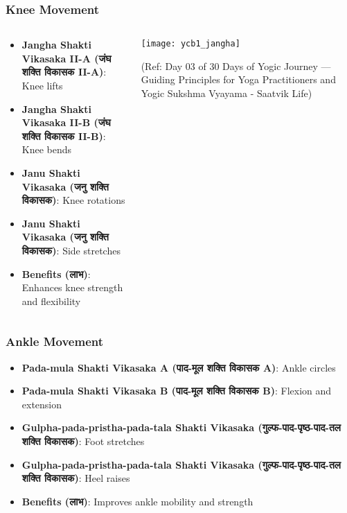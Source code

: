 \begin{frame}[fragile]\frametitle{Knee Movement}
\begin{columns}
    \begin{column}[T]{0.5\linewidth}
      \begin{itemize}
		\item \textbf{Jangha Shakti Vikasaka II-A (जंघ शक्ति विकासक II-A)}: Knee lifts
		\item \textbf{Jangha Shakti Vikasaka II-B (जंघ शक्ति विकासक II-B)}: Knee bends
		\item \textbf{Janu Shakti Vikasaka (जनु शक्ति विकासक)}: Knee rotations
		\item \textbf{Janu Shakti Vikasaka (जनु शक्ति विकासक)}: Side stretches
		\item \textbf{Benefits (लाभ)}: Enhances knee strength and flexibility
	  \end{itemize}
    \end{column}
    \begin{column}[T]{0.5\linewidth}
		\begin{center}
		\texttt{[image: ycb1\_jangha]}
		
		{\tiny (Ref: Day 03 of 30 Days of Yogic Journey — Guiding Principles for Yoga Practitioners and Yogic Sukshma Vyayama - Saatvik Life)}	

		\end{center}	
    \end{column}
\end{columns}
\end{frame}


\begin{frame}[fragile]\frametitle{Ankle Movement}
      \begin{itemize}
		\item \textbf{Pada-mula Shakti Vikasaka A (पाद-मूल शक्ति विकासक A)}: Ankle circles
		\item \textbf{Pada-mula Shakti Vikasaka B (पाद-मूल शक्ति विकासक B)}: Flexion and extension
		\item \textbf{Gulpha-pada-pristha-pada-tala Shakti Vikasaka (गुल्फ-पाद-पृष्ठ-पाद-तल शक्ति विकासक)}: Foot stretches
		\item \textbf{Gulpha-pada-pristha-pada-tala Shakti Vikasaka (गुल्फ-पाद-पृष्ठ-पाद-तल शक्ति विकासक)}: Heel raises
		\item \textbf{Benefits (लाभ)}: Improves ankle mobility and strength
	  \end{itemize}
\end{frame}


